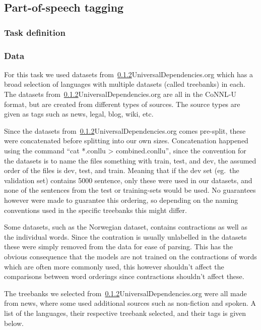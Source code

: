 
\subsection{Part-of-speech tagging}


\subsubsection{Task definition}


\subsubsection{Data}

For this task we used datasets from~\ref{}{UniversalDependencies.org} which has
a broad selection of languages with multiple datasets (called treebanks) in
each. The datasets from~\ref{}{UniversalDependencies.org} are all in the CoNNL-U
format, but are created from different types of sources. The source types are
given as tags such as news, legal, blog, wiki, etc.

Since the datasets from~\ref{}{UniversalDependencies.org} comes pre-split, these
were concatenated before splitting into our own sizes. Concatenation happened
using the command ``cat *.conllu > combined.conllu'', since the convention for
the datasets is to name the files something with train, test, and dev, the
assumed order of the files is dev, test, and train. Meaning that if the dev set
(eg.\ the validation set) contains 5000 sentence, only these were used in our
datasets, and none of the sentences from the test or training-sets would be
used. No guarantees however were made to guarantee this ordering, so depending
on the naming conventions used in the specific treebanks this might differ.

Some datasets, such as the Norwegian dataset, contains contractions as well as
the individual words. Since the contration is usually unlabelled in the datasets
these were simply removed from the data for ease of parsing. This has the
obvious consequence that the models are not trained on the contractions of words
which are often more commonly used, this however shouldn't affect the
comparisons between word orderings since contractions shouldn't affect these.

The treebanks we selected from~\ref{}{UniversalDependencies.org} were all made
from news, where some used additional sources such as non-fiction and spoken. A
list of the languages, their respective treebank selected, and their tags is
given below.


